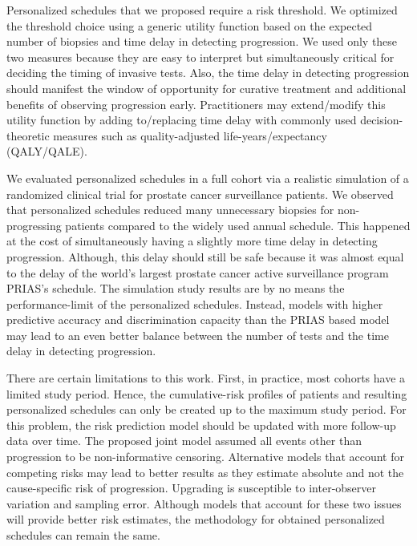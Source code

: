 Personalized schedules that we proposed require a risk threshold. We optimized the threshold choice using a generic utility function based on the expected number of biopsies and time delay in detecting progression. We used only these two measures because they are easy to interpret but simultaneously critical for deciding the timing of invasive tests. Also, the time delay in detecting progression should manifest the window of opportunity for curative treatment and additional benefits of observing progression early. Practitioners may extend/modify this utility function by adding to/replacing time delay with commonly used decision-theoretic measures such as quality-adjusted life-years/expectancy (QALY/QALE).

We evaluated personalized schedules in a full cohort via a realistic simulation of a randomized clinical trial for prostate cancer surveillance patients. We observed that personalized schedules reduced many unnecessary biopsies for non-progressing patients compared to the widely used annual schedule. This happened at the cost of simultaneously having a slightly more time delay in detecting progression. Although, this delay should still be safe because it was almost equal to the delay of the world's largest prostate cancer active surveillance program PRIAS's schedule. The simulation study results are by no means the performance-limit of the personalized schedules. Instead, models with higher predictive accuracy and discrimination capacity than the PRIAS based model may lead to an even better balance between the number of tests and the time delay in detecting progression.

There are certain limitations to this work. First, in practice, most cohorts have a limited study period. Hence, the cumulative-risk profiles of patients and resulting personalized schedules can only be created up to the maximum study period. For this problem, the risk prediction model should be updated with more follow-up data over time. The proposed joint model assumed all events other than progression to be non-informative censoring. Alternative models that account for competing risks may lead to better results as they estimate absolute and not the cause-specific risk of progression. Upgrading is susceptible to inter-observer variation and sampling error. Although models that account for these two issues~\citep{balasubramanian2003estimation,coley2017prediction} will provide better risk estimates, the methodology for obtained personalized schedules can remain the same.